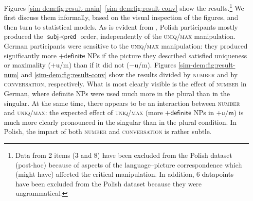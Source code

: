 \documentclass[output=paper]{langscibook}
\begin{document}
Figures \ref{sim-dem:fig:result-main}--\ref{sim-dem:fig:result-conv} show the results.{\footnote{Data from 2 items (3 and 8) have been excluded from the Polish dataset (post-hoc) because of aspects of the language--picture correspondence which (might have) affected the critical manipulation. In addition, 6 datapoints have been excluded from the Polish dataset because they were ungrammatical.\label{sim-dem:fn:excluded-items}}} We first discuss them informally, based on the visual inspection of the figures, and then turn to statistical models. As is evident from , Polish participants mostly produced the $\textsf{subj}\prec\textsf{pred}$ order, independently of the \textsc{uniq/max} manipulation. German participants were sensitive to the \textsc{uniq/max} manipulation: they produced significantly more $+\textsf{definite}$ NPs if the picture they described satisfied uniqueness or maximality (\textsf{$+$u/m}) than if it did not (\textsf{$-$u/m}). Figures \ref{sim-dem:fig:result-num} and \ref{sim-dem:fig:result-conv} show the results divided by \textsc{number} and by \textsc{conversation}, respectively. What is most clearly visible is the effect of \textsc{number} in German, where definite NPs were used much more in the \textsf{plural} than in the \textsf{singular}. At the same time, there appears to be an interaction between \textsc{number} and \textsc{uniq/max}: the expected effect of \textsc{uniq/max} (more $+\textsf{definite}$ NPs in $+\textsf{u/m}$) is much more clearly pronounced in the \textsf{singular} than in the \textsf{plural} condition. In Polish, the impact of both \textsc{number} and \textsc{conversation} is rather subtle.
\end{document}
